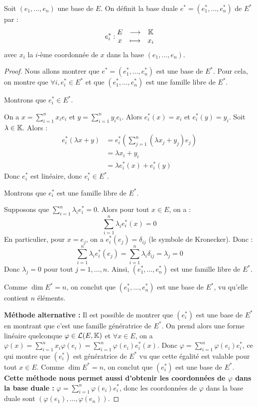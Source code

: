 \documentclass[11pt,a4paper]{report}
\begin{document}
\begin{proposition}
    Soit $(e_1, \dots, e_n)$ une base de $E$. On définit la base duale $e^* = (e_1^*, \dots, e_n^*)$ de $E^*$ par :
    $$e_i^* : \begin{matrix} E & \longrightarrow & \mathbb{K} \\ x & \longmapsto & x_i \end{matrix}$$
    avec $x_i$ la $i$-ème coordonnée de $x$ dans la base $(e_1, \dots, e_n)$.
\end{proposition}

\begin{proof}
    Nous allons montrer que $e^* = (e_1^*, \dots, e_n^*)$ est une base de $E^*$. Pour cela, on montre que $\forall i, e_i^* \in E^*$ et que $(e_1^*, \dots, e_n^*)$ est une famille libre de $E^*$.

    Montrons que $e_i^* \in E^*$.

    On a $x = \sum_{i=1}^n x_i e_i$ et $y = \sum_{i=1}^n y_i e_i$. Alors $e_i^*(x) = x_i$ et $e_i^*(y) = y_i$. Soit $\lambda \in \mathbb{K}$. Alors :
    \begin{align*}
        e_i^*(\lambda x + y) &= e_i^*\left(\sum_{j=1}^n (\lambda x_j + y_j) e_j\right) \\
        &= \lambda x_i + y_i \\
        &= \lambda e_i^*(x) + e_i^*(y)
    \end{align*}
    Donc $e_i^*$ est linéaire, donc $e_i^* \in E^*$.

    Montrons que $e_i^*$ est une famille libre de $E^*$.
    
    Supposons que $\sum_{i=1}^n \lambda_i e_i^* = 0$. Alors pour tout $x \in E$, on a :
    $$\sum_{i=1}^n \lambda_i e_i^*(x) = 0$$
    En particulier, pour $x = e_j$, on a $e_i^*(e_j) = \delta_{ij}$ (le symbole de Kronecker). Donc :
    $$\sum_{i=1}^n \lambda_i e_i^*(e_j) = \sum_{i=1}^n \lambda_i \delta_{ij} = \lambda_j = 0$$
    Donc $\lambda_j = 0$ pour tout $j = 1, \dots, n$. Ainsi, $(e_1^*, \dots, e_n^*)$ est une famille libre de $E^*$.

    Comme $\dim E^* = n$, on conclut que $(e_1^*, \dots, e_n^*)$ est une base de $E^*$, vu qu'elle contient $n$ éléments.

    \textbf{Méthode alternative : } Il est possible de montrer que $(e_i^*)$ est une base de $E^*$ en montrant que c'est une famille génératrice de $E^*$. On prend alors une forme linéaire quelconque $\varphi \in \mathcal L(E,\mathbb{K})$ et $\forall x \in E$, on a $\varphi(x) = \sum_{i=1}^n x_i \varphi(e_i) = \sum_{i=1}^n \varphi(e_i) e_i^*(x)$. Donc $\varphi = \sum_{i=1}^n \varphi(e_i) e_i^*$, ce qui montre que $(e_i^*)$ est génératrice de $E^*$ vu que cette égalité est valable pour tout $x \in E$. Comme $\dim E^* = n$, on conclut que $(e_i^*)$ est une base de $E^*$. \textbf{Cette méthode nous permet aussi d'obtenir les coordonnées de $\varphi$ dans la base duale : } $\varphi = \sum_{i=1}^n \varphi(e_i) e_i^*$, donc les coordonnées de $\varphi$ dans la base duale sont $(\varphi(e_1), \dots, \varphi(e_n))$.
\end{proof}
\end{document}
